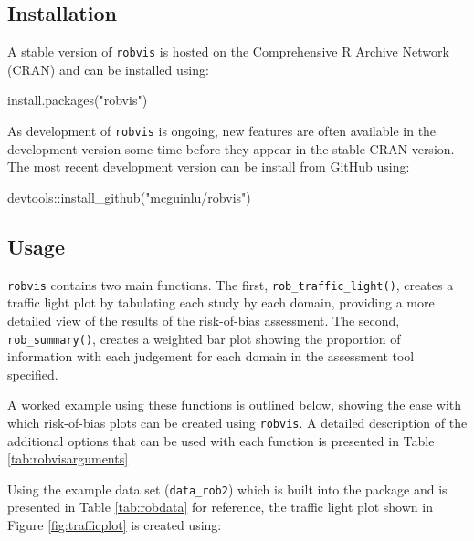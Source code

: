 \documentclass[a4paper, twoside]{templates/ociamthesis}
\newenvironment{Shaded}{\begin{snugshade}}{\end{snugshade}}
\newcommand{\FunctionTok}[1]{\textcolor[rgb]{0.00,0.00,0.00}{#1}}
\newcommand{\NormalTok}[1]{#1}
\newcommand{\SpecialCharTok}[1]{\textcolor[rgb]{0.00,0.00,0.00}{#1}}
\newcommand{\StringTok}[1]{\textcolor[rgb]{0.31,0.60,0.02}{#1}}
\renewenvironment{Shaded}
{
  \vspace{4pt}%
  \begin{snugshade}%
}{%
  \end{snugshade}%
  \vspace{4pt}%
}
\begin{document}
\hypertarget{installation-1}{%
\subsection{Installation}\label{installation-1}}

A stable version of \texttt{robvis} is hosted on the Comprehensive R Archive Network (CRAN) and can be installed using:

\begin{Shaded}
\begin{Highlighting}[]
\FunctionTok{install.packages}\NormalTok{(}\StringTok{"robvis"}\NormalTok{)}
\end{Highlighting}
\end{Shaded}

As development of \texttt{robvis} is ongoing, new features are often available in the development version some time before they appear in the stable CRAN version. The most recent development version can be install from GitHub using:

\begin{Shaded}
\begin{Highlighting}[]
\NormalTok{devtools}\SpecialCharTok{::}\FunctionTok{install\_github}\NormalTok{(}\StringTok{"mcguinlu/robvis"}\NormalTok{)}
\end{Highlighting}
\end{Shaded}

\hypertarget{usage-1}{%
\subsection{Usage}\label{usage-1}}

\texttt{robvis} contains two main functions. The first, \texttt{rob\_traffic\_light()}, creates a traffic light plot by tabulating each study by each domain, providing a more detailed view of the results of the risk-of-bias assessment. The second, \texttt{rob\_summary()}, creates a weighted bar plot showing the proportion of information with each judgement for each domain in the assessment tool specified.

A worked example using these functions is outlined below, showing the ease with which risk-of-bias plots can be created using \texttt{robvis}. A detailed description of the additional options that can be used with each function is presented in Table \ref{tab:robvisarguments}

Using the example data set (\texttt{data\_rob2}) which is built into the package and is presented in Table \ref{tab:robdata} for reference, the traffic light plot shown in Figure \ref{fig:trafficplot} is created using:
\end{document}
